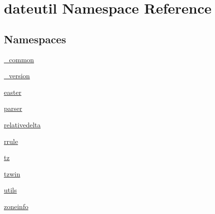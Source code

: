 \hypertarget{namespacedateutil}{}\section{dateutil Namespace Reference}
\label{namespacedateutil}
\subsection*{Namespaces}
\begin{DoxyCompactItemize}
\item 
 \hyperlink{namespacedateutil_1_1__common}{\+\_\+common}
\item 
 \hyperlink{namespacedateutil_1_1__version}{\+\_\+version}
\item 
 \hyperlink{namespacedateutil_1_1easter}{easter}
\item 
 \hyperlink{namespacedateutil_1_1parser}{parser}
\item 
 \hyperlink{namespacedateutil_1_1relativedelta}{relativedelta}
\item 
 \hyperlink{namespacedateutil_1_1rrule}{rrule}
\item 
 \hyperlink{namespacedateutil_1_1tz}{tz}
\item 
 \hyperlink{namespacedateutil_1_1tzwin}{tzwin}
\item 
 \hyperlink{namespacedateutil_1_1utils}{utils}
\item 
 \hyperlink{namespacedateutil_1_1zoneinfo}{zoneinfo}
\end{DoxyCompactItemize}

